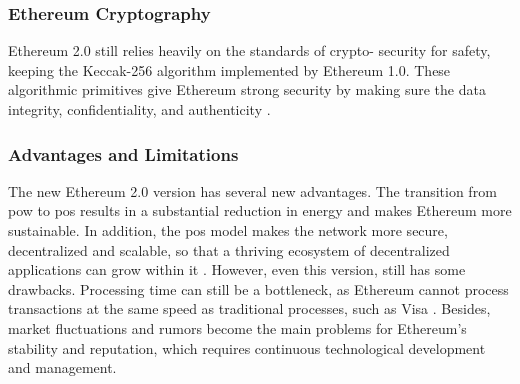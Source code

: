 \subsubsection{Ethereum Cryptography}

Ethereum 2.0 still relies heavily on the standards of crypto- security for safety, keeping the Keccak-256 algorithm implemented by Ethereum 1.0. These 
algorithmic primitives give Ethereum strong security by making sure the data integrity, confidentiality, and authenticity \cite{9129332}.

\subsubsection{Advantages and Limitations}

The new Ethereum 2.0 version has several new advantages. The transition from \gls{pow} to \gls{pos} results in a substantial reduction in energy and makes Ethereum more sustainable. In 
addition, the \gls{pos} model makes the network more secure, decentralized and scalable, so that a thriving ecosystem of decentralized applications can grow within it \cite{ethereumpos}. 
However, even this version, still has some drawbacks. Processing time can still be a bottleneck, as Ethereum cannot process transactions at the same speed as traditional 
processes, such as Visa \cite{9129332}. Besides, market fluctuations and rumors become the main problems for Ethereum's stability and reputation, which requires continuous 
technological development and management.
